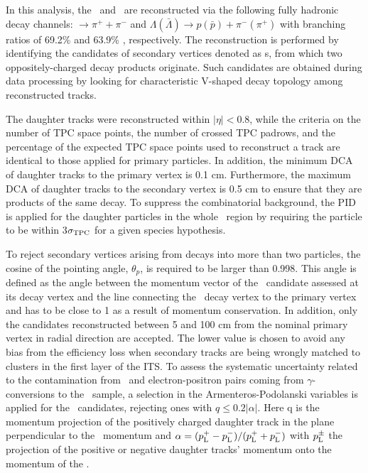 
In this analysis, the \Ks~and \lambdas~are reconstructed via the following fully hadronic decay channels: \Ks $\rightarrow \pi^{+} + \pi^{-}$ and  $\Lambda(\bar{\Lambda})\rightarrow p(\bar{p})+\pi^{-}(\pi^{+})$ with branching ratios of 69.2\% and 63.9\% \cite{Olive_2016}, respectively. The reconstruction is performed by identifying the candidates of secondary vertices denoted as \vo s, from which two oppositely-charged decay products originate. Such candidates are obtained during data processing by looking for characteristic V-shaped decay topology among reconstructed tracks.

The daughter tracks were reconstructed within $|\eta|<0.8$, while the criteria on the number of TPC space points, the number of crossed TPC padrows, and the percentage of the expected TPC space points used to reconstruct a track are identical to those applied for primary particles. In addition, the minimum DCA of daughter tracks to the primary vertex is 0.1 cm. Furthermore, the maximum DCA of daughter tracks to the secondary vertex is 0.5 cm to ensure that they are products of the same decay. To suppress the combinatorial background, the PID is applied for the daughter particles in the whole \pT~region by requiring the particle to be within 3$\sigma_{\rm TPC}$ for a given species hypothesis.

To reject secondary vertices arising from decays into more than two particles, the cosine of the pointing angle, $\theta_{p}$, is required to be larger than 0.998. This angle is defined as the angle between the momentum vector of the \vo~candidate assessed at its decay vertex and the line connecting the \vo~decay vertex to the primary vertex and has to be close to 1 as a result of momentum conservation. In addition, only the candidates reconstructed between 5 and 100 cm from the nominal primary vertex in radial direction are accepted. The lower value is chosen to avoid any bias from the efficiency loss when secondary tracks are being wrongly matched to clusters in the first layer of the ITS. To assess the systematic uncertainty related to the contamination from \lambdas~and electron-positron pairs coming from $\gamma$-conversions to the \Ks~sample, a selection in the Armenteros-Podolanski variables \cite{doi:10.1080/14786440108520416} is applied for the \Ks~candidates, rejecting ones with $q\le 0.2|\alpha|$. Here q is the momentum projection of the positively charged daughter track in the plane perpendicular to the \vo~momentum and $\alpha = (p_{\rm{L}}^{+} - p_{\rm{L}}^{-})/(p_{\rm{L}}^{+} + p_{\rm{L}}^{-})$ with $p_{\rm{L}}^{\pm}$ the projection of the positive or negative daughter tracks' momentum onto the momentum of the
\vo.

